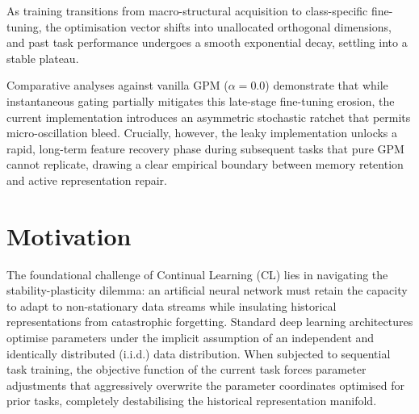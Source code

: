 \documentclass[10pt,a4paper]{article}
\begin{document}
	As training transitions from macro-structural acquisition to class-specific fine-tuning, the optimisation vector shifts into unallocated orthogonal dimensions, and past task performance undergoes a smooth exponential decay, settling into a stable plateau.
	
	Comparative analyses against vanilla GPM ($\alpha=0.0$) demonstrate that while instantaneous gating partially mitigates this late-stage fine-tuning erosion, the current implementation introduces an asymmetric stochastic ratchet that permits micro-oscillation bleed. Crucially, however, the leaky implementation unlocks a rapid, long-term feature recovery phase during subsequent tasks that pure GPM cannot replicate, drawing a clear empirical boundary between memory retention and active representation repair.
	
	\section{Motivation}
	The foundational challenge of Continual Learning (CL) lies in navigating the stability-plasticity dilemma: an artificial neural network must retain the capacity to adapt to non-stationary data streams while insulating historical representations from catastrophic forgetting. Standard deep learning architectures optimise parameters under the implicit assumption of an independent and identically distributed (i.i.d.) data distribution. When subjected to sequential task training, the objective function of the current task forces parameter adjustments that aggressively overwrite the parameter coordinates optimised for prior tasks, completely destabilising the historical representation manifold.
	
\end{document}
